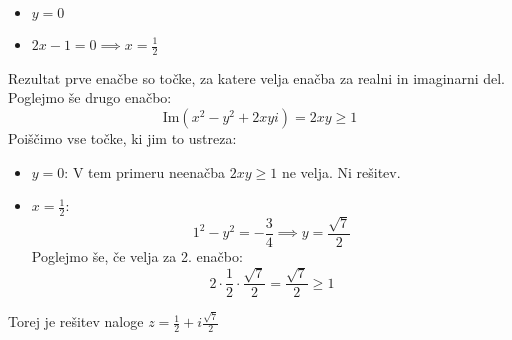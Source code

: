 \documentclass[12pt,a4paper,slovene]{article}
\begin{document}
\begin{enumerate}[(1)]
\begin{itemize}
        \begin{itemize}
            \item $y = 0$
            \item $2x  - 1 = 0 \implies x = \frac{1}{2}$
        \end{itemize}
    \end{itemize}
    Rezultat prve enačbe so točke, za katere velja enačba za realni in imaginarni del. Poglejmo še drugo enačbo:
    \[
    \text{Im}(x^2 - y^2 + 2xyi) = 2xy \geq 1
    \]
    Poiščimo vse točke, ki jim to ustreza:
    \begin{itemize}
        \item $y = 0$: V tem primeru neenačba $2xy \geq 1$ ne velja. Ni rešitev.
        \item $x = \frac{1}{2}$:
        \[
        1^2 - y^2 = -\frac{3}{4} \implies y = \frac{\sqrt{7}}{2}
        \]
        Poglejmo še, če velja za 2. enačbo:
        \[
        2 \cdot \frac{1}{2} \cdot \frac{\sqrt{7}}{2} = \frac{\sqrt{7}}{2} \geq 1
        \]
    \end{itemize}
    Torej je rešitev naloge $z = \frac{1}{2} + i \frac{\sqrt{7}}{2} $

\end{enumerate}
\end{document}
